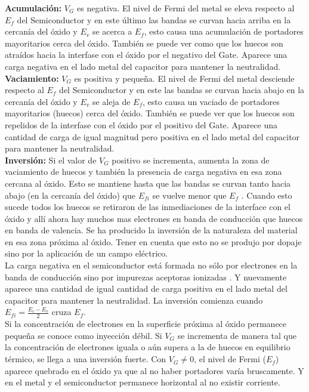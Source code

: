 \documentclass[oneside]{book}
\numberwithin{equation}{section}
\numberwithin{figure}{section}
\numberwithin{table}{section}
\begin{document}
				\textbf{Acumulación:} $V_G$ es negativa. El nivel de Fermi del metal se eleva respecto al $E_f$ del Semiconductor y en este último las bandas se curvan hacia arriba en la cercanía del óxido y $E_v$ se acerca a $E_f$, esto causa una acumulación de portadores mayoritarios cerca del óxido. También se puede ver como que los huecos son atraídos hacia la interfase con el óxido por el negativo del Gate. Aparece una carga negativa en el lado metal del capacitor para mantener la neutralidad.\\

				\textbf{Vaciamiento:} $V_G$ es positiva y pequeña. El nivel de Fermi del metal desciende respecto al $E_f$ del Semiconductor y en este las bandas se curvan hacia abajo en la cercanía del óxido y $E_v$ se aleja de $E_f$, esto causa un vaciado de portadores mayoritarios (huecos) cerca del óxido. También se puede ver que los huecos son repelidos de la interfase con el óxido por el positivo del Gate. Aparece una cantidad de carga de igual magnitud pero positiva en el lado metal del capacitor para mantener la neutralidad.\\

				\textbf{Inversión:} Si el valor de $V_G$ positivo se incrementa, aumenta la zona de vaciamiento de huecos y también la presencia de carga negativa en esa zona cercana al óxido. Esto se mantiene hasta que las bandas se curvan tanto hacia abajo (en la cercanía del óxido) que $E_{fi}$ se vuelve menor que $E_f$ . Cuando esto sucede todos los huecos se retiraron de las inmediaciones de la interface con el óxido y allí ahora hay muchos mas electrones en banda de conducción que huecos en banda de valencia. Se ha producido la inversión de la naturaleza del material en esa zona próxima al óxido. Tener en cuenta que esto no se produjo por dopaje sino por la aplicación de un campo eléctrico.\\
				
				La carga negativa en el semiconductor está formada no sólo por electrones en la banda de conducción sino por impurezas aceptoras ionizadas . Y nuevamente aparece una cantidad de igual cantidad de carga positiva en el lado metal del capacitor para mantener la neutralidad.
La inversión comienza cuando $E_{fi}=\frac{E_c-E_v}{2}$ cruza $E_f$.\\

				Si la concentración de electrones en la superficie próxima al óxido permanece pequeña se conoce como inyección débil. Si $V_G$ se incrementa de manera tal que la concentración de electrones iguala o aún supera a la de huecos en equilibrio térmico, se llega a una inversión fuerte.
Con $V_G \neq 0$, el nivel de Fermi ($E_f$) aparece quebrado en el óxido ya que al no haber portadores varía bruscamente. Y en el metal y el semiconductor permanece horizontal al no existir corriente.\\
\end{document}
